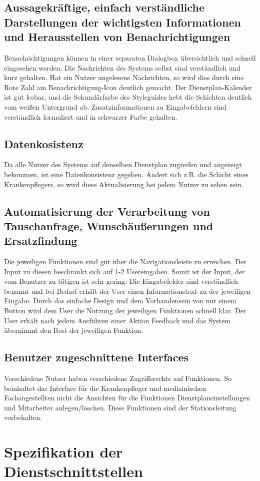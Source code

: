 \documentclass[11pt,
paper=a4,
bibtotocnumbered,	  %
liststotocnumbered,  %
DIV=calc,		  %
tablecaptionabove,	  %
headinclude,
]{article}
\begin{document}
\subsection{Aussagekräftige, einfach verständliche Darstellungen der wichtigsten Informationen und Herausstellen von Benachrichtigungen}
Benachrichtigungen können in einer separaten Dialogbox übersichtlich und schnell eingesehen werden. Die Nachrichten des Systems selbst sind verständlich und kurz gehalten.  Hat ein Nutzer ungelesene Nachrichten, so wird dies durch eine Rote Zahl am Benachrichtigung-Icon deutlich gemacht. Der Dienstplan-Kalender ist gut lesbar, und die Sekundärfarbe des Styleguides hebt die Schichten deutlich vom weißen Untergrund ab. Zusatzinformationen zu Eingabefeldern sind verständlich formuliert und in schwarzer Farbe gehalten.
\subsection{Datenkosistenz}
Da alle Nutzer des Systems auf denselben Dienstplan zugreifen und angezeigt bekommen, ist eine Datenkonsistenz gegeben. Ändert sich z.B. die Schicht eines Krankenpflegers, so wird diese Aktualisierung bei jedem Nutzer zu sehen sein.
\subsection{Automatisierung der Verarbeitung von Tauschanfrage, Wunschäußerungen und Ersatzfindung}
Die jeweiligen Funktionen sind gut über die Navigationsleiste zu erreichen. Der Input zu diesen beschränkt sich auf 1-2 Usereingaben. Somit ist der Input, der vom Benutzer zu tätigen ist sehr gering. Die Eingabefelder sind verständlich benannt und bei Bedarf erhält der User einen Informationstext zu der jeweiligen Eingabe. Durch das einfache Design und dem Vorhandensein von nur einem Button wird dem User die Nutzung der jeweiligen Funktionen schnell klar. Der User erhält nach jedem Ausführen einer Aktion Feedback und das System übernimmt den Rest der jeweiligen Funktion.
\subsection{Benutzer zugeschnittene Interfaces}
Verschiedene Nutzer haben verschiedene Zugriffsrechte auf Funktionen. So beinhaltet das Interface für die Krankenpfleger und medizinischen Fachangestellten nicht die Ansichten für die Funktionen Dienstplaneinstellungen und Mitarbeiter anlegen/löschen. Diese Funktionen sind der Stationsleitung vorbehalten.
\section{Spezifikation der Dienstschnittstellen}
\end{document}
